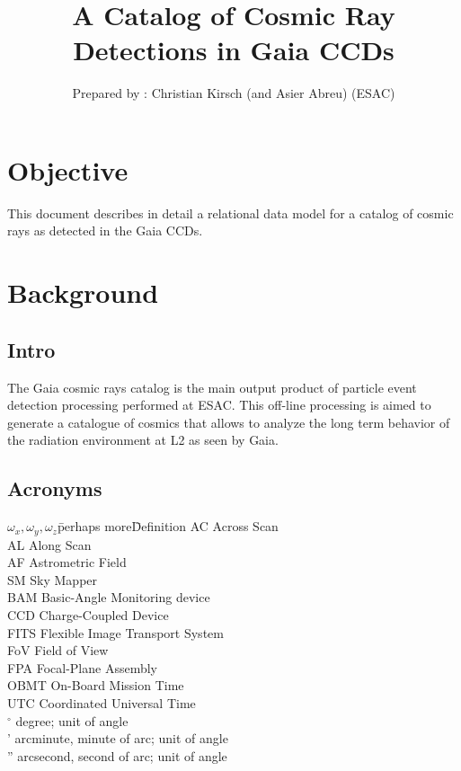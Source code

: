 \documentclass[a4paper, 11pt]{article}
\title{A Catalog of Cosmic Ray Detections in Gaia CCDs}
\author{Prepared by : Christian Kirsch (and Asier Abreu) (ESAC)}
\date{\parbox{\linewidth}{\centering%
  \today\endgraf\bigskip\endgraf
  Document Version : \dmVersion}}
\begin{document}
\maketitle
\tableofcontents
\begin{versionhistory}
\end{versionhistory}

\newpage
\section{Objective}
\label{sec:objective}

This document describes in detail a relational data model for a catalog of cosmic rays as detected in the Gaia CCDs. 

\section{Background}

\subsection{Intro}

The Gaia cosmic rays catalog is the main output product of particle event detection processing performed at ESAC. This off-line processing is aimed to generate a catalogue of cosmics that allows to analyze the long term behavior of the radiation environment at L2 as seen by Gaia. 

\subsection{Acronyms}

\begin{tabbing}
$\omega_x,\omega_y,\omega_z$\qquad \= perhaps more\= Definition \kill
AC \> Across Scan\\
AL \> Along Scan\\
AF \> Astrometric Field \\
SM \> Sky Mapper\\
BAM \> Basic-Angle Monitoring device\\ 
CCD \> Charge-Coupled Device \\
FITS \> Flexible Image Transport System\\   
FoV \> Field of View\\
FPA \> Focal-Plane Assembly\\
OBMT \> On-Board Mission Time\\
UTC \> Coordinated Universal Time\\
$^\circ$ \> degree; unit of angle\\
' \> arcminute, minute of arc; unit of angle\\
'' \> arcsecond, second of arc; unit of angle\\
\end{tabbing}
\end{document}
